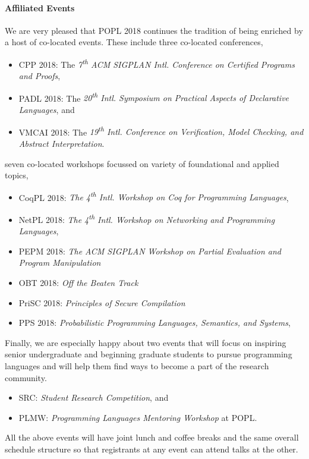\paragraph{Affiliated Events}
%
We are very pleased that POPL 2018 continues the tradition of being enriched
by a host of co-located events.
%
These include three co-located conferences,
%
\begin{itemize}
  \item CPP 2018:   The \emph{7\textsuperscript{th} ACM SIGPLAN Intl. Conference on Certified Programs and Proofs},
  \item PADL 2018:  The \emph{20\textsuperscript{th} Intl. Symposium on Practical Aspects of Declarative Languages}, and
  \item VMCAI 2018: The \emph{19\textsuperscript{th} Intl. Conference on Verification, Model Checking, and Abstract Interpretation}.
\end{itemize}
%
seven co-located workshops focussed on variety of foundational and applied topics,
%
\begin{itemize}
  \item CoqPL 2018: \emph{The 4\textsuperscript{th} Intl. Workshop on Coq for Programming Languages},
  \item NetPL 2018: \emph{The 4\textsuperscript{th} Intl. Workshop on Networking and Programming Languages},
  \item PEPM 2018:  \emph{The ACM SIGPLAN Workshop on Partial Evaluation and Program Manipulation}
  \item OBT 2018:   \emph{Off the Beaten Track}
  \item PriSC 2018: \emph{Principles of Secure Compilation}
  \item PPS 2018:   \emph{Probabilistic Programming Languages, Semantics, and Systems},
\end{itemize}
%
Finally, we are especially happy about two events that
will focus on inspiring senior undergraduate and beginning
graduate students to pursue programming languages and
will help them find ways to become a part of the research
community.
%
\begin{itemize}
\item SRC: \emph{Student Research Competition}, and
\item PLMW: \emph{Programming Languages Mentoring Workshop} at POPL.
\end{itemize}
%
All the above events will have joint lunch and coffee breaks
and the same overall schedule structure so that registrants
at any event can attend talks at the other.

